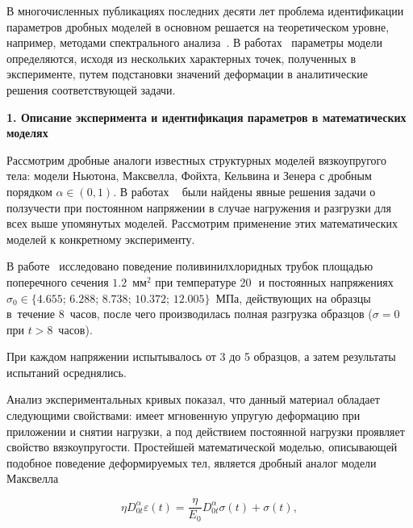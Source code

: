 \documentclass[11pt,a4paper,twoside]{article}
\begin{document}
В многочисленных публикациях последних десяти лет проблема идентификации параметров дробных моделей в основном решается на теоретическом уровне, например, методами спектрального анализа~\cite{Vasques}. В работах~\cite{Erohin2015,Erohin_Disser} параметры модели определяются, исходя из нескольких характерных точек, полученных в эксперименте, путем подстановки значений деформации в аналитические решения соответствующей задачи.





\smallskip





{\bf1. Описание эксперимента и идентификация параметров в математических моделях} 





Рассмотрим дробные аналоги известных структурных моделей вязкоупругого тела: модели Ньютона, Максвелла, Фойхта, Кельвина и Зенера с дробным порядком $\alpha\in(0,1)$. В работах ~\cite{OgoRadUng16, Abusaitova_some_special_functions} были найдены явные решения задачи о ползучести при постоянном напряжении в случае нагружения и разгрузки для всех выше упомянутых моделей. Рассмотрим применение этих математических моделей к конкретному эксперименту.


В работе~\cite{RadchenkoGoludin} исследовано поведение поливинилхлоридных трубок площадью поперечного сечения $1.2$~мм$^{2}$ при температуре 20\,\textcelsius\ и постоянных напряжениях $\sigma_{0}\in\bigl\{4.655$; $6.288$; $8.738$; $10.372$; $12.005\bigr\}$~МПа, действующих на образцы  в~течение $8$~часов, после чего производилась полная разгрузка образцов ($\sigma=0$ при $t>8$~часов). 


При каждом напряжении испытывалось от 3 до 5 образцов, а затем результаты испытаний осреднялись. 


Анализ экспериментальных кривых показал, что данный материал обладает следующими свойствами: имеет мгновенную упругую деформацию при приложении и снятии нагрузки, а под действием постоянной нагрузки проявляет свойство вязкоупругости. Простейшей математической моделью, описывающей подобное поведение деформируемых тел, является дробный аналог модели Максвелла


\begin{equation}\label{FracMaxwell}


\eta D^{\alpha}_{0t}\varepsilon(t)=\frac{\eta}{E_{0}}D^{\alpha}_{0t}\sigma(t)+\sigma(t),


\end{equation}
\end{document}
